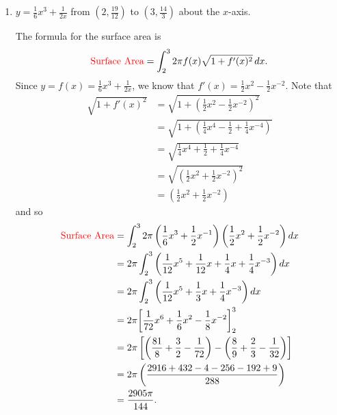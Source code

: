\documentclass[handout]{ximera}
\begin{document}
\begin{problem}
\begin{enumerate}
	
		\item  $y = \frac{1}{6} x^3 + \frac{1}{2x}$ from $\left( 2, \frac{19}{12} \right)$ to $\left( 3, \frac{14}{3} \right)$ about the $x$-axis.
		\begin{freeResponse}
		The formula for the surface area is
			\[
			\text{{\color{red} Surface Area}} = \int_2^3 2 \pi f(x) \sqrt{1+f'(x)^2} \mathop{}\!d x.
			\]
		Since $y = f(x) = \frac{1}{6} x^3 + \frac{1}{2x}$, we know that $f'(x) = \frac{1}{2} x^2 - \frac{1}{2} x^{-2}$.  
		Note that
			\begin{align*}
			\sqrt{1+f'(x)^2} &= \sqrt{1+ \left( \frac{1}{2}x^2 - \frac{1}{2}x^{-2} \right)^2}  \\
			&= \sqrt{1+ \left( \frac{1}{4}x^4 - \frac{1}{2} + \frac{1}{4}x^{-4} \right)}  \\
			&= \sqrt{\frac{1}{4}x^4 + \frac{1}{2} + \frac{1}{4}x^{-4}}  \\
			&= \sqrt{\left( \frac{1}{2}x^2 + \frac{1}{2}x^{-2} \right)^2}  \\
			&= \left( \frac{1}{2}x^2 + \frac{1}{2}x^{-2} \right)
			\end{align*}
		and so
			\begin{align*}
			\text{{\color{red} Surface Area}} &= \int_2^3 2 \pi \left( \frac{1}{6} x^3 + \frac{1}{2} x^{-1} \right) \left( \frac{1}{2} x^2 + \frac{1}{2} x^{-2} \right) \mathop{}\!d x  \\
			&= 2 \pi \int_2^3 \left( \frac{1}{12} x^5 + \frac{1}{12} x + \frac{1}{4} x + \frac{1}{4} x^{-3} \right) \mathop{}\!d x  \\
			&= 2 \pi \int_2^3 \left( \frac{1}{12} x^5 + \frac{1}{3} x + \frac{1}{4} x^{-3} \right) \mathop{}\!d x  \\
			&= 2 \pi \bigg[ \frac{1}{72}x^6 + \frac{1}{6}x^2 - \frac{1}{8}x^{-2} \bigg]_2^3  \\
			&= 2\pi \left[ \left( \frac{81}{8} + \frac{3}{2} - \frac{1}{72} \right) - \left( \frac{8}{9} + \frac{2}{3} - \frac{1}{32} \right) \right]  \\
			&= 2\pi \left( \frac{2916 + 432 - 4 - 256 - 192 + 9}{288} \right)  \\
			&= \frac{2905 \pi}{144}.
			\end{align*}
		\end{freeResponse}
		
		
		

	\end{enumerate}
	
\end{problem}
\end{document}
